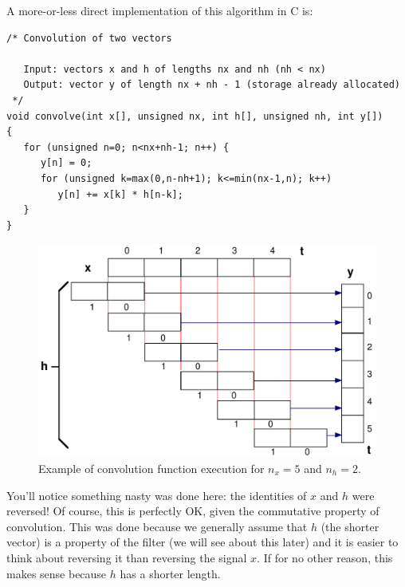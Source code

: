 A more-or-less direct implementation of this algorithm in C is:

\begin{small}
\begin{verbatim}
/* Convolution of two vectors

   Input: vectors x and h of lengths nx and nh (nh < nx)
   Output: vector y of length nx + nh - 1 (storage already allocated)
 */
void convolve(int x[], unsigned nx, int h[], unsigned nh, int y[])
{
   for (unsigned n=0; n<nx+nh-1; n++) {
      y[n] = 0;
      for (unsigned k=max(0,n-nh+1); k<=min(nx-1,n); k++)
         y[n] += x[k] * h[n-k];
   }
}
\end{verbatim}
\end{small}

\begin{figure}
\centerline{\includegraphics[width=\textwidth]{ch-conv/fig6-5}}
\caption{Example of convolution function execution for $n_x=5$ and
$n_h=2$.\label{fg:convex}}
\end{figure}

You'll notice something nasty was done here: the identities of
$x$ and $h$ were reversed! Of course, this is perfectly OK, given the commutative
property of convolution. This was done because we generally assume that $h$
(the shorter vector) is a property of the filter (we will see about
this later) and it is easier to think about reversing
it than reversing the signal $x$. If for no other reason, this makes
sense because $h$ has a shorter length.


